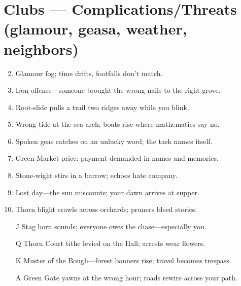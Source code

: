 \section*{Clubs --- Complications/Threats (glamour, geasa, weather, neighbors)}
\begin{enumerate}
\setcounter{enumi}{1}
\item Glamour fog; time drifts, footfalls don't match.
\item Iron offense---someone brought the wrong nails to the right grove.
\item Root-slide pulls a trail two ridges away while you blink.
\item Wrong tide at the sea-arch; boats rise where mathematics say no.
\item Spoken geas catches on an unlucky word; the task names itself.
\item Green Market price: payment demanded in names and memories.
\item Stone-wight stirs in a barrow; echoes hate company.
\item Lost day---the sun miscounts; your dawn arrives at supper.
\item Thorn blight crawls across orchards; pruners bleed stories.
\item[J] Stag horn sounds; everyone owes the chase---especially you.
\item[Q] Thorn Court tithe levied on the Hall; arrests wear flowers.
\item[K] Muster of the Bough---forest banners rise; travel becomes trespass.
\item[A] Green Gate yawns at the wrong hour; roads rewire across your path.
\end{enumerate}

